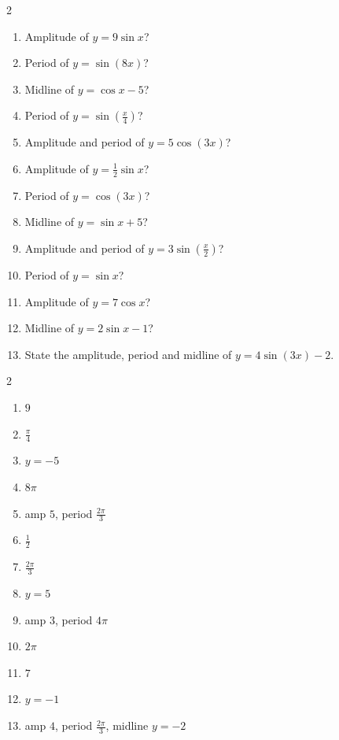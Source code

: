 \documentclass[11pt]{article}
\begin{document}
\begin{recapbox}
\begin{multicols}{2}
\small
\begin{enumerate}[leftmargin=*,itemsep=3pt]
  \item Amplitude of $y=9\sin x$?
  \item Period of $y=\sin(8x)$?
  \item Midline of $y=\cos x-5$?
  \item Period of $y=\sin(\tfrac{x}{4})$?
  \item Amplitude and period of $y=5\cos(3x)$?
  \item Amplitude of $y=\tfrac12\sin x$?
  \item Period of $y=\cos(3x)$?
  \item Midline of $y=\sin x+5$?
  \item Amplitude and period of $y=3\sin(\tfrac{x}{2})$?
  \item Period of $y=\sin x$?
  \item Amplitude of $y=7\cos x$?
  \item Midline of $y=2\sin x-1$?
  \item State the amplitude, period and midline of $y=4\sin(3x)-2$.
\end{enumerate}
\end{multicols}
\end{recapbox}

\begin{keybox}
\begin{multicols}{2}
\small
\begin{enumerate}[leftmargin=*,itemsep=3pt]
  \item $9$
  \item $\tfrac{\pi}{4}$
  \item $y=-5$
  \item $8\pi$
  \item amp $5$, period $\tfrac{2\pi}{3}$
  \item $\tfrac12$
  \item $\tfrac{2\pi}{3}$
  \item $y=5$
  \item amp $3$, period $4\pi$
  \item $2\pi$
  \item $7$
  \item $y=-1$
  \item amp $4$, period $\tfrac{2\pi}{3}$, midline $y=-2$
\end{enumerate}
\end{multicols}
\end{keybox}
\end{document}
